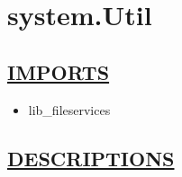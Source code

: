 \chapter*{system.Util}
\hypertarget{ecldoc:toc:system.Util}{}

\section*{\underline{IMPORTS}}
\begin{itemize}
\item lib\_fileservices
\end{itemize}

\section*{\underline{DESCRIPTIONS}}
